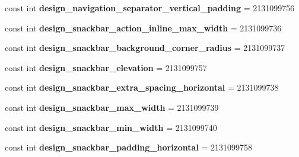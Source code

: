\begin{DoxyCompactItemize}
const int {\bfseries design\+\_\+navigation\+\_\+separator\+\_\+vertical\+\_\+padding} = 2131099756
\item 
\mbox{\label{class_sample_app_1_1_droid_1_1_resource_1_1_dimension_ab1ce63ecb5df6d7c651cab151aa6b36f}} 
const int {\bfseries design\+\_\+snackbar\+\_\+action\+\_\+inline\+\_\+max\+\_\+width} = 2131099736
\item 
\mbox{\label{class_sample_app_1_1_droid_1_1_resource_1_1_dimension_a19345ff9521f25377e1765a3671ea317}} 
const int {\bfseries design\+\_\+snackbar\+\_\+background\+\_\+corner\+\_\+radius} = 2131099737
\item 
\mbox{\label{class_sample_app_1_1_droid_1_1_resource_1_1_dimension_aff48a9bf49c681c47b76714ad531ba00}} 
const int {\bfseries design\+\_\+snackbar\+\_\+elevation} = 2131099757
\item 
\mbox{\label{class_sample_app_1_1_droid_1_1_resource_1_1_dimension_a9f45de53fbc5a5be0c49f8869931c7aa}} 
const int {\bfseries design\+\_\+snackbar\+\_\+extra\+\_\+spacing\+\_\+horizontal} = 2131099738
\item 
\mbox{\label{class_sample_app_1_1_droid_1_1_resource_1_1_dimension_a06533843da6aeacf00f2efc2492b05e8}} 
const int {\bfseries design\+\_\+snackbar\+\_\+max\+\_\+width} = 2131099739
\item 
\mbox{\label{class_sample_app_1_1_droid_1_1_resource_1_1_dimension_a00e9e54e74396dd0610a82d10ff564e5}} 
const int {\bfseries design\+\_\+snackbar\+\_\+min\+\_\+width} = 2131099740
\item 
\mbox{\label{class_sample_app_1_1_droid_1_1_resource_1_1_dimension_ad5a2ea2e8d727a6d00064e0f8dd93c1c}} 
const int {\bfseries design\+\_\+snackbar\+\_\+padding\+\_\+horizontal} = 2131099758
\item 
\mbox{\label{class_sample_app_1_1_droid_1_1_resource_1_1_dimension_a9f860d9e421f5ce675f6807ef9ea611d}} 

\end{DoxyCompactItemize}
